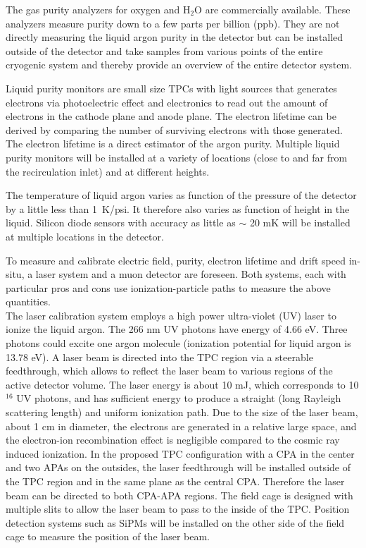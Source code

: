 The gas purity analyzers for oxygen and H$_{2}$O are commercially available. These analyzers measure purity down to a few parts per billion (ppb). They are not directly measuring the liquid argon purity in the detector but can be installed outside of the detector and take samples from various points of the entire cryogenic system and thereby provide an overview of the entire detector system.

Liquid purity monitors are small size TPCs with light sources that generates electrons via photoelectric effect and electronics to read out the amount of electrons in the cathode plane and anode plane. The electron lifetime can be derived by comparing the number of surviving electrons with those generated. The electron lifetime is a direct estimator of the argon purity.
Multiple liquid purity monitors will be installed at a variety of locations (close to and far from the recirculation inlet) and at different heights.

The temperature of liquid argon varies as function of the pressure of the detector by a little less than 1~K/psi. It therefore also varies 
as function of height in the liquid. Silicon diode sensors with accuracy as little as $\sim$ 20 mK will be installed at multiple locations in the detector.

To measure and calibrate electric field, purity, electron lifetime and drift speed in-situ, a laser system and a muon detector are foreseen. 
Both systems, each with particular pros and cons use ionization-particle paths to measure the above quantities.\\
%
The laser calibration system employs a high power ultra-violet (UV) laser to ionize the liquid argon. The 266 nm UV photons have energy of 4.66 eV. Three photons could excite one argon molecule (ionization potential for liquid argon is 13.78 eV). 
A laser beam is directed into the TPC region via a steerable feedthrough, which allows to reflect the laser beam to various regions of the 
active detector volume. 
The laser energy is about 10 mJ, which corresponds to 10$^{16}$ UV photons, and has sufficient energy to produce 
a straight (long Rayleigh scattering length) and uniform ionization path. Due to the size of the laser beam, about 1 cm in diameter, 
the electrons are generated in a relative large space, and the electron-ion recombination effect is negligible compared to the cosmic ray 
induced ionization. In the proposed TPC configuration with a CPA in the center and two APAs on the outsides, 
the laser feedthrough will be installed outside of the TPC region and in the same plane as the central CPA.
Therefore the laser beam can be directed to both CPA-APA regions. The field cage is designed with multiple slits to allow the laser 
beam to pass to the inside of the TPC. Position detection systems such as SiPMs will be installed on the other side of the field cage 
to measure the position of the laser beam.

